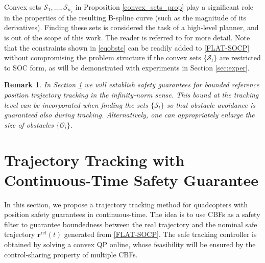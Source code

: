 \documentclass[journal,10pt]{IEEEtran}
\newtheorem{remark}{\bfseries Remark}
\newcommand{\vect}[1]{\boldsymbol{\mathbf{#1}}}
\newif\ifdraft
\newcommand{\XX}[1]{\ifdraft{\color{red}[{\bf XX}: #1]}\fi}
\begin{document}
%

Convex sets $\mathcal{S}_1,\ldots,\mathcal{S}_{n_s}$ in Proposition \ref{convex_sets_prop} play a significant role in the properties of the resulting B-spline curve (such as the magnitude of its derivatives). Finding these sets is considered the task of a high-level planner, and is out of the scope of this work. The reader is referred to \cite{tang2019time,sun2020fast} for more detail. Note that the constraints shown in  \eqref{eqobstc}  can be readily added to \eqref{FLAT-SOCP} without compromising the problem structure if the convex sets $\{\mathcal{S}_l\}$ are restricted to SOC form, as will be demonstrated with experiments in Section \ref{sec:exper}.


\begin{remark}
In Section \ref{sec:track} we will establish safety guarantees for bounded reference position trajectory tracking in the infinity-norm sense. This bound at the tracking level can be incorporated when finding the sets $\{\mathcal{S}_l\}$ so that obstacle avoidance is guaranteed also during tracking. Alternatively, one can appropriately enlarge the size of obstacles $\{\mathcal{O}_i\}$.
\end{remark}

\section{Trajectory Tracking with Continuous-Time Safety Guarantee} \label{sec:track}
In this section, we propose a trajectory tracking method for quadcopters with position safety guarantees in continuous-time. The idea is to use CBFs as a safety filter to guarantee boundedness between the real trajectory and the nominal safe trajectory $\vect{r}^{\text{ref}}(t)$ generated from \eqref{FLAT-SOCP}. The safe tracking controller is obtained by solving a convex QP online, whose feasibility will be ensured by the control-sharing property of multiple CBFs. %
\end{document}
